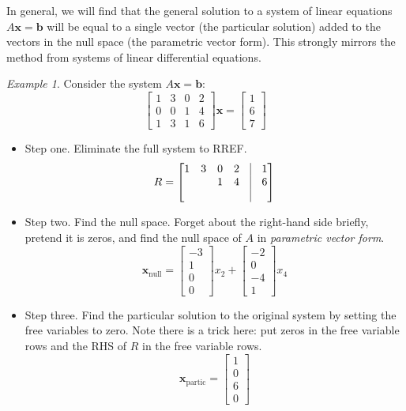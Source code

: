 \documentclass[11pt,oneside]{amsbook}
\theoremstyle{definition}
\theoremstyle{plain}
\theoremstyle{definition}
\theoremstyle{remark}
\newtheorem{example}[theorem]{Example}
\numberwithin{equation}{section}
\numberwithin{figure}{section}
\begin{document}
In general, we will find that the general solution to a system of linear equations $A\mathbf{x}=\mathbf{b}$ will be equal to a single vector (the particular solution) added to the vectors in the null space (the parametric vector form). This strongly mirrors the method from systems of linear differential equations.

\begin{example}
  Consider the system $A\mathbf{x}=\mathbf{b}$:
  \[\begin{bmatrix}
      1&3&0&2\\0&0&1&4\\1&3&1&6
    \end{bmatrix}
    \mathbf{x}=
    \begin{bmatrix}
      1\\6\\7
    \end{bmatrix}
  \]
  \begin{itemize}
  \item Step one. Eliminate the full system to RREF.
    \[R=\begin{bmatrix}
        1&3&0&2&\vline&1\\
        &&1&4&\vline&6\\
        &&&&\vline&
      \end{bmatrix}
    \]
  \item Step two. Find the null space. Forget about the right-hand side briefly, pretend it is zeros, and find the null space of $A$ in \emph{parametric vector form}.
  \[\mathbf{x}_{\mathrm{null}}
  =\begin{bmatrix}-3\\1\\0\\0\end{bmatrix}x_2
  +\begin{bmatrix}-2\\0\\-4\\1\end{bmatrix}x_4
  \]
  \item Step three. Find the particular solution to the original system by setting the free variables to zero. Note there is a trick here: put zeros in the free variable rows and the RHS of $R$ in the free variable rows.
  \[\mathbf{x}_{\mathrm{partic}}
  =\begin{bmatrix}1\\0\\6\\0\end{bmatrix}
\]
\end{itemize}
\end{example}
\end{document}
